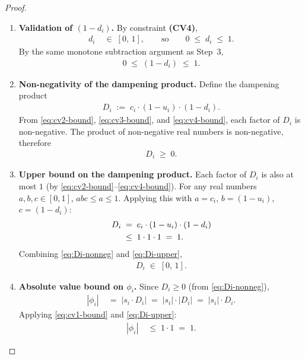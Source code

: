 \documentclass[12pt,openany]{book}
\numberwithin{equation}{chapter}
\theoremstyle{plain}
\theoremstyle{definition}
\theoremstyle{remark}
\numberwithin{equation}{chapter}
\theoremstyle{plain}
\begin{document}
\begin{proof}
\begin{enumerate}
  \item \textbf{Validation of $(1 - d_i)$.}
        By constraint \textbf{(CV4)},
        \begin{align}
          d_i &\;\in\; [0,\,1],
          \qquad\text{so}\qquad
          0 \;\leq\; d_i \;\leq\; 1.
        \end{align}
        By the same monotone subtraction argument as Step~3,
        \begin{align}
          0 \;\leq\; (1 - d_i) \;\leq\; 1.
          \label{eq:cv4-bound}
        \end{align}

  \item \textbf{Non-negativity of the dampening product.}
        Define the dampening product
        \begin{align}
          D_i \;:=\; c_i \cdot (1 - u_i) \cdot (1 - d_i).
          \label{eq:Di-def}
        \end{align}
        From \eqref{eq:cv2-bound}, \eqref{eq:cv3-bound}, and
        \eqref{eq:cv4-bound}, each factor of $D_i$ is non-negative.
        The product of non-negative real numbers is non-negative,
        therefore
        \begin{align}
          D_i \;\geq\; 0.
          \label{eq:Di-nonneg}
        \end{align}

  \item \textbf{Upper bound on the dampening product.}
        Each factor of $D_i$ is also at most $1$
        (by \eqref{eq:cv2-bound}--\eqref{eq:cv4-bound}).
        For any real numbers $a, b, c \in [0,1]$,
        $abc \leq a \leq 1$.
        Applying this with
        $a = c_i$, $b = (1-u_i)$, $c = (1-d_i)$:
        \begin{align}
          D_i
          &\;=\; c_i \cdot (1-u_i) \cdot (1-d_i)
          \notag\\
          &\;\leq\; 1 \cdot 1 \cdot 1
          \;=\; 1.
          \label{eq:Di-upper}
        \end{align}
        Combining \eqref{eq:Di-nonneg} and \eqref{eq:Di-upper},
        \begin{align}
          D_i \;\in\; [0,\,1].
          \label{eq:Di-range}
        \end{align}

  \item \textbf{Absolute value bound on $\phi_i$.}
        Since $D_i \geq 0$ (from \eqref{eq:Di-nonneg}),
        \begin{align}
          |\phi_i|
          &\;=\; |s_i \cdot D_i|
          \;=\; |s_i| \cdot |D_i|
          \;=\; |s_i| \cdot D_i.
          \label{eq:phi-abs-split}
        \end{align}
        Applying \eqref{eq:cv1-bound} and \eqref{eq:Di-upper}:
        \begin{align}
          |\phi_i|
          &\;\leq\; 1 \cdot 1
          \;=\; 1.
          \label{eq:phi-abs-bound}
        \end{align}


\end{enumerate}
\end{proof}
\end{document}
